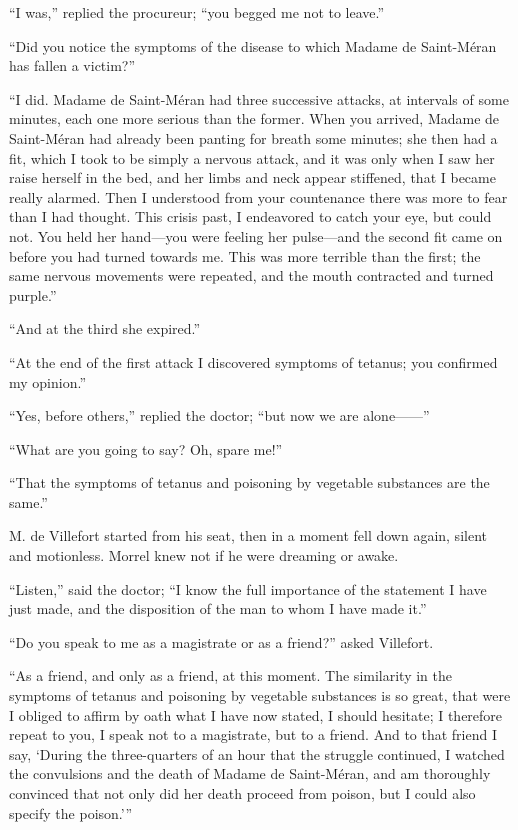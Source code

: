 “I was,” replied the procureur; “you begged me not to leave.”

“Did you notice the symptoms of the disease to which Madame de
Saint-Méran has fallen a victim?”

“I did. Madame de Saint-Méran had three successive attacks, at
intervals of some minutes, each one more serious than the former. When
you arrived, Madame de Saint-Méran had already been panting for breath
some minutes; she then had a fit, which I took to be simply a nervous
attack, and it was only when I saw her raise herself in the bed, and
her limbs and neck appear stiffened, that I became really alarmed. Then
I understood from your countenance there was more to fear than I had
thought. This crisis past, I endeavored to catch your eye, but could
not. You held her hand—you were feeling her pulse—and the second fit
came on before you had turned towards me. This was more terrible than
the first; the same nervous movements were repeated, and the mouth
contracted and turned purple.”

“And at the third she expired.”

“At the end of the first attack I discovered symptoms of tetanus; you
confirmed my opinion.”

“Yes, before others,” replied the doctor; “but now we are alone——”

“What are you going to say? Oh, spare me!”

“That the symptoms of tetanus and poisoning by vegetable substances are
the same.”

M. de Villefort started from his seat, then in a moment fell down
again, silent and motionless. Morrel knew not if he were dreaming or
awake.

“Listen,” said the doctor; “I know the full importance of the statement
I have just made, and the disposition of the man to whom I have made
it.”

“Do you speak to me as a magistrate or as a friend?” asked Villefort.

“As a friend, and only as a friend, at this moment. The similarity in
the symptoms of tetanus and poisoning by vegetable substances is so
great, that were I obliged to affirm by oath what I have now stated, I
should hesitate; I therefore repeat to you, I speak not to a
magistrate, but to a friend. And to that friend I say, ‘During the
three-quarters of an hour that the struggle continued, I watched the
convulsions and the death of Madame de Saint-Méran, and am thoroughly
convinced that not only did her death proceed from poison, but I could
also specify the poison.’”

